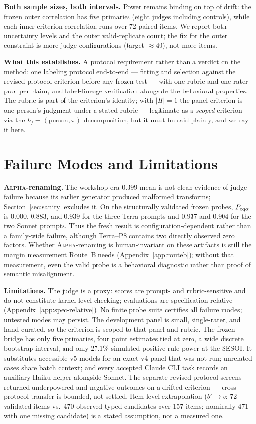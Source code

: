 \documentclass{article}
\begin{document}
\textbf{Both sample sizes, both intervals.}
Power remains binding on top of drift: the frozen outer correlation has five primaries (eight judges including controls), while each inner criterion correlation runs over 72 paired items.
We report both uncertainty levels and the outer valid-replicate count; the fix for the outer constraint is more judge configurations (target ${\approx}40$), not more items.

\textbf{What this establishes.}
A protocol requirement rather than a verdict on the method: one labeling protocol end-to-end --- fitting and selection against the revised-protocol criterion before any frozen test --- with one rubric and one rater pool per claim, and label-lineage verification alongside the behavioral properties.
The rubric is part of the criterion's identity; with $\lvert H \rvert = 1$ the panel criterion is one person's judgment under a stated rubric --- legitimate as a \emph{scoped} criterion via the $h_j = (\text{person}, \pi)$ decomposition, but it must be said plainly, and we say it here.

\section{Failure Modes and Limitations}\label{sec:failure}

\textbf{\textsc{Alpha}-renaming.}
The workshop-era $0.399$ mean is not clean evidence of judge failure because its earlier generator produced malformed transforms; Section~\ref{sec:sanity} excludes it. On the structurally validated frozen probes, $P_{\rm eq\alpha}$ is $0.000$, $0.883$, and $0.939$ for the three Terra prompts and $0.937$ and $0.904$ for the two Sonnet prompts. Thus the fresh result is configuration-dependent rather than a family-wide failure, although Terra--P8 contains two directly observed zero factors. Whether \textsc{Alpha}-renaming is human-invariant on these artifacts is still the margin measurement Route~B needs (Appendix~\ref{app:routeb}); without that measurement, even the valid probe is a behavioral diagnostic rather than proof of semantic misalignment.

\textbf{Limitations.}
The judge is a proxy: scores are prompt- and rubric-sensitive and do not constitute kernel-level checking; evaluations are specification-relative (Appendix~\ref{app:spec-relative}).
No finite probe suite certifies all failure modes; untested modes may persist.
The development panel is small, single-rater, and hand-curated, so the criterion is scoped to that panel and rubric. The frozen bridge has only five primaries, four point estimates tied at zero, a wide discrete bootstrap interval, and only 27.1\% simulated positive-rule power at the SESOI. It substitutes accessible v5 models for an exact v4 panel that was not run; unrelated cases share batch context; and every accepted Claude CLI task records an auxiliary Haiku helper alongside Sonnet. The separate revised-protocol screens returned underpowered and negative outcomes on a drifted criterion --- cross-protocol transfer is bounded, not settled.
Item-level extrapolation ($b' \to b$: 72 validated items vs.\ 470 observed typed candidates over 157 items; nominally 471 with one missing candidate) is a stated assumption, not a measured one.
\end{document}
